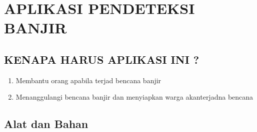 \section{APLIKASI PENDETEKSI BANJIR}

\subsection{KENAPA HARUS APLIKASI INI ?}
\begin{enumerate}
\item Membantu orang apabila terjad bencana banjir
\item Menanggulangi bencana banjir dan menyiapkan warga akanterjadna bencana
\end{enumerate}

\subsection{Alat dan Bahan} 
